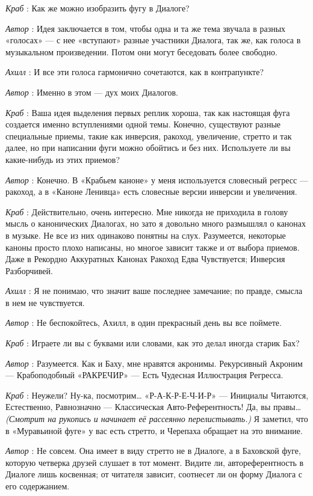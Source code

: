 \documentclass[../main.tex]{subfiles}
\begin{document}
\begin{dialogue}
\emph{Краб} : Как же можно изобразить фугу в Диалоге?

\emph{Автор} : Идея заключается в том, чтобы одна и та же тема звучала в разных «голосах» --- с нее «вступают» разные участники Диалога, так же, как голоса в музыкальном произведении. Потом они могут беседовать более свободно.

\emph{Ахилл} : И все эти голоса гармонично сочетаются, как в контрапункте?

\emph{Автор} : Именно в этом --- дух моих Диалогов.

\emph{Краб} : Ваша идея выделения первых реплик хороша, так как настоящая фуга создается именно вступлениями одной темы. Конечно, существуют разные специальные приемы, такие как инверсия, ракоход, увеличение, стретто и так далее, но при написании фуги можно обойтись и без них. Используете ли вы какие-нибудь из этих приемов?

\emph{Автор} : Конечно. В «Крабьем каноне» у меня используется словесный регресс --- ракоход, а в «Каноне Ленивца» есть словесные версии инверсии и увеличения.

\emph{Краб} : Действительно, очень интересно. Мне никогда не приходила в голову мысль о канонических Диалогах, но зато я довольно много размышлял о канонах в музыке. Не все из них одинаково понятны на слух. Разумеется, некоторые каноны просто плохо написаны, но многое зависит также и от выбора приемов. Даже в Рекордно Аккуратных Канонах Ракоход Едва Чувствуется; Инверсия Разборчивей.

\emph{Ахилл} : Я не понимаю, что значит ваше последнее замечание; по правде, смысла в нем не чувствуется.

\emph{Автор} : Не беспокойтесь, Ахилл, в один прекрасный день вы все поймете.

\emph{Краб} : Играете ли вы с буквами или словами, как это делал иногда старик Бах?

\emph{Автор} : Разумеется. Как и Баху, мне нравятся акронимы. Рекурсивный Акроним --- Крабоподобный «РАКРЕЧИР» --- Есть Чудесная Иллюстрация Регресса.

\emph{Краб} : Неужели? Ну-ка, посмотрим\ldots{} «Р-А-К-Р-Е-Ч-И-Р» --- Инициалы Читаются, Естественно, Равнозначно --- Классическая Авто-Референтность! Да, вы правы\ldots{} \emph{(Смотрит на рукопись и начинает её рассеянно перелистывать.)} Я заметил, что в «Муравьиной фуге» у вас есть стретто, и Черепаха обращает на это внимание.

\emph{Автор} : Не совсем. Она имеет в виду стретто не в Диалоге, а в Баховской фуге, которую четверка друзей слушает в тот момент. Видите ли, автореферентность в Диалоге лишь косвенная; от читателя зависит, соотнесет ли он форму Диалога с его содержанием.


\end{dialogue}
\end{document}
